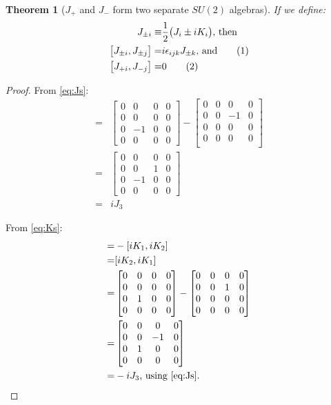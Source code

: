 \documentclass[]{article}
\newcommand\numberthis{\addtocounter{equation}{1}\tag{\theequation}}
\newtheorem{thm}{Theorem}
\begin{document}
\begin{thm}[$J_{+}$ and $J_{-}$ form two separate $SU(2)$ algebras]
	If we define:
	\begin{align*}
		J_{\pm i} \equiv & \frac{1}{2}\big(J_i\pm i K_i\big)\text{, then}\\
		\big[J_{\pm i},J_{\pm j}\big] =& i \epsilon_{ijk} J_{\pm k} \text{, and} \numberthis \label{eq:J:pm}\\
		\big[J_{+i},J_{-j}\big] =& 0 \numberthis \label{eq:J:pm1}
	\end{align*}
\end{thm}
\begin{proof}
	From \eqref{eq:Js}:
	\begin{align*}
		[J_1, J_2] =& \begin{bmatrix}
			0&0&0&0\\
			0&0&0&0\\
			0&-1&0&0\\
			0&0&0&0
		\end{bmatrix} - \begin{bmatrix}
							0&0&0&0\\
							0&0&-1&0\\
							0&0&0&0\\
							0&0&0&0\\
						\end{bmatrix}\\
		 =& \begin{bmatrix}
				0&0&0&0\\
				0&0&1&0\\
				0&-1&0&0\\
				0&0&0&0
			\end{bmatrix}\\
			=&i J_3
	\end{align*}
	
	From \eqref{eq:Ks}:
	\begin{align*}
		[K_1,K_2] =& -[i K_1, i K_2] \\
		=& [i K_2,i K_1] \\
		=& \begin{bmatrix}
			0&0&0&0\\
			0&0&0&0\\
			0&1&0&0\\
			0&0&0&0\\
		\end{bmatrix} -  \begin{bmatrix}
								0&0&0&0\\
								0&0&1&0\\
								0&0&0&0\\
								0&0&0&0\\
						 \end{bmatrix}\\
		 =&\begin{bmatrix}
			0&0&0&0\\
			0&0&-1&0\\
			0&1&0&0\\
			0&0&0&0\\
		\end{bmatrix}\\
		=& -i J_3 \text{, using \eqref{eq:Js}.}
	\end{align*}
	


\end{proof}
\end{document}
